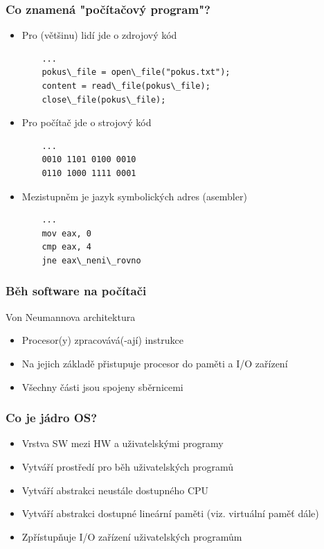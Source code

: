 \documentclass[professionalfonts,svgnames]{beamer}
\begin{document}
\begin{frame}[fragile]
\frametitle{Co znamená "počítačový program"?}
\begin{itemize} %
	\item Pro (většinu) lidí jde o zdrojový kód
\begin{verbatim}
	...
	pokus\_file = open\_file("pokus.txt");
	content = read\_file(pokus\_file);
	close\_file(pokus\_file);
\end{verbatim}
	\item Pro počítač jde o strojový kód
\begin{verbatim}
	...
	0010 1101 0100 0010
	0110 1000 1111 0001
\end{verbatim}
	\item Mezistupněm je jazyk symbolických adres (asembler)
\begin{verbatim}
	...
	mov eax, 0
	cmp eax, 4
	jne eax\_neni\_rovno
\end{verbatim}
\end{itemize}
\end{frame}

\begin{frame}
\frametitle{Běh software na počítači}
Von Neumannova architektura
\begin{itemize} %
	\item Procesor(y) zpracovává(-ají) instrukce
	\item Na jejich základě přistupuje procesor do paměti a I/O zařízení
	\item Všechny části jsou spojeny sběrnicemi
\end{itemize}
\end{frame}

\begin{frame}
\frametitle{Co je jádro OS?}
\begin{itemize} %
	\item Vrstva SW mezi HW a uživatelskými programy
	\item Vytváří prostředí pro běh uživatelských programů
	\item Vytváří abstrakci neustále dostupného CPU
	\item Vytváří abstrakci dostupné lineární paměti (viz. virtuální paměť dále)
	\item Zpřístupňuje I/O zařízení uživatelských programům
\end{itemize}
\end{frame}
\end{document}
